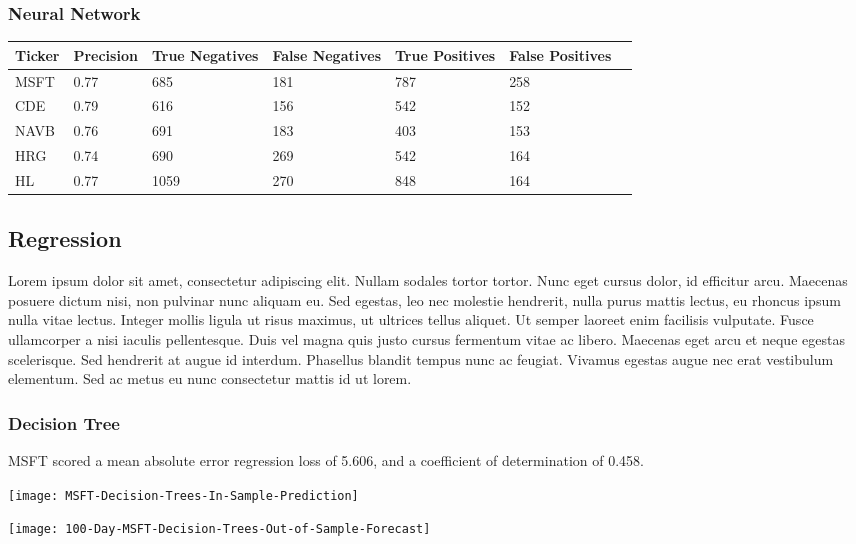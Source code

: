 \subsubsection{Neural Network}

\begin{center}
    \begin{tabular}{ | l | l | l | | l | l | l | p{5cm} |}
    \hline
    Ticker & Precision & True Negatives & False Negatives & True Positives & False Positives \\ \hline
    MSFT & 0.77 & 685 & 181 & 787 & 258 \\ \hline
    CDE & 0.79 & 616 & 156 & 542 & 152 \\ \hline
    NAVB & 0.76 & 691 & 183 & 403 & 153 \\ \hline
    HRG & 0.74 & 690 & 269 & 542 & 164 \\ \hline
    HL & 0.77 & 1059 & 270 & 848 & 164 \\
    \hline
    \end{tabular}
\end{center}

\subsection{Regression}
Lorem ipsum dolor sit amet, consectetur adipiscing elit. Nullam sodales tortor tortor. Nunc eget cursus dolor, id efficitur arcu. Maecenas posuere dictum nisi, non pulvinar nunc aliquam eu. Sed egestas, leo nec molestie hendrerit, nulla purus mattis lectus, eu rhoncus ipsum nulla vitae lectus. Integer mollis ligula ut risus maximus, ut ultrices tellus aliquet. Ut semper laoreet enim facilisis vulputate. Fusce ullamcorper a nisi iaculis pellentesque. Duis vel magna quis justo cursus fermentum vitae ac libero. Maecenas eget arcu et neque egestas scelerisque. Sed hendrerit at augue id interdum. Phasellus blandit tempus nunc ac feugiat. Vivamus egestas augue nec erat vestibulum elementum. Sed ac metus eu nunc consectetur mattis id ut lorem.

\subsubsection{Decision Tree}
MSFT scored a mean absolute error regression loss of 5.606, and a coefficient of determination of 0.458.

\texttt{[image: MSFT-Decision-Trees-In-Sample-Prediction]}

\texttt{[image: 100-Day-MSFT-Decision-Trees-Out-of-Sample-Forecast]}

